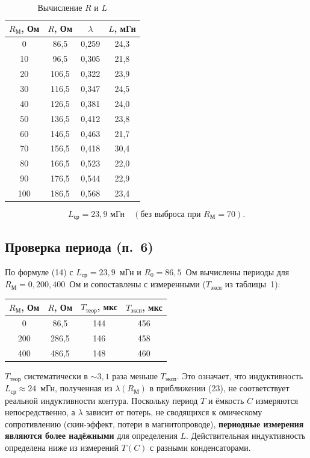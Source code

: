 \begin{table}[H]
\centering
\caption{Вычисление $R$ и $L$}
\small
\begin{tabular}{|c|c|c|c|}
\hline
$R_\text{М}$, Ом & $R$, Ом & $\lambda$ & $L$, мГн \\
\hline
0   & 86,5 & 0,259 & 24,3 \\
10  & 96,5 & 0,305 & 21,8 \\
20  & 106,5 & 0,322 & 23,9 \\
30  & 116,5 & 0,347 & 24,5 \\
40  & 126,5 & 0,381 & 24,0 \\
50  & 136,5 & 0,412 & 23,8 \\
60  & 146,5 & 0,463 & 21,7 \\
70  & 156,5 & 0,418 & 30,4 \\
80  & 166,5 & 0,523 & 22,0 \\
90  & 176,5 & 0,544 & 22,9 \\
100 & 186,5 & 0,568 & 23,4 \\
\hline
\end{tabular}
\normalsize
\end{table}

\[
L_\text{ср} = 23{,}9 \text{ мГн} \quad (\text{без выброса при } R_\text{М}=70).
\]

\subsection{Проверка периода (п.~6)}

По формуле (14) с $L_\text{ср} = 23{,}9$~мГн и $R_0 = 86{,}5$~Ом вычислены периоды для $R_\text{М} = 0, 200, 400$~Ом и сопоставлены с измеренными ($T_\text{эксп}$ из таблицы~1):

\begin{center}
\begin{tabular}{|c|c|c|c|}
\hline
$R_\text{М}$, Ом & $R$, Ом & $T_\text{теор}$, мкс & $T_\text{эксп}$, мкс \\
\hline
0   & 86,5  & 144 & 456 \\
200 & 286,5 & 146 & 458 \\
400 & 486,5 & 148 & 460 \\
\hline
\end{tabular}
\end{center}

$T_\text{теор}$ систематически в $\sim 3{,}1$ раза меньше $T_\text{эксп}$. Это означает, что индуктивность $L_\text{ср} \approx 24$~мГн, полученная из $\lambda(R_\text{М})$ в приближении (23), не соответствует реальной индуктивности контура. Поскольку период $T$ и ёмкость $C$ измеряются непосредственно, а $\lambda$ зависит от потерь, не сводящихся к омическому сопротивлению (скин-эффект, потери в магнитопроводе), \textbf{периодные измерения являются более надёжными} для определения $L$. Действительная индуктивность определена ниже из измерений $T(C)$ с разными конденсаторами.

